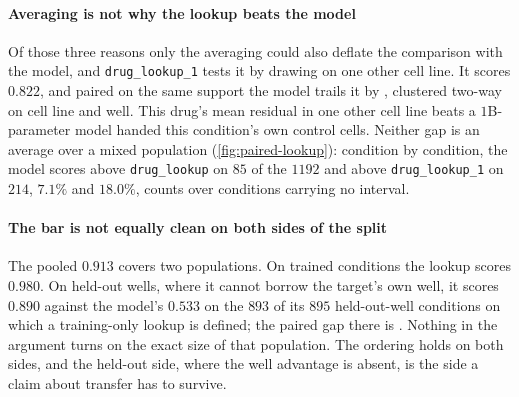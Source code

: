 \paragraph{Averaging is not why the lookup beats the model} Of those three
reasons only the averaging could also deflate the comparison with the model, and
\texttt{drug\_lookup\_1} tests it by drawing on one other cell line. It scores
$0.822$, and paired on the same support the model trails it by
, clustered two-way on cell line and well. This
drug's mean residual in one other cell line beats a $1$B-parameter model handed
this condition's own control cells. Neither gap is an average over a mixed
population (\cref{fig:paired-lookup}): condition by condition, the model scores
above \texttt{drug\_lookup} on $85$ of the $\num{1192}$ and above
\texttt{drug\_lookup\_1} on $214$, $7.1\%$ and $18.0\%$, counts over conditions
carrying no interval.

\paragraph{The bar is not equally clean on both sides of the split} The pooled
$0.913$ covers two populations. On trained conditions the lookup scores $0.980$.
On held-out wells, where it cannot borrow the target's own well, it scores
$0.890$ against the model's $0.533$ on the $893$ of its $895$ held-out-well
conditions on which a training-only lookup is defined; the paired gap there is . Nothing in the
argument turns on the exact size of that population. The ordering holds on both
sides, and the held-out side, where the well advantage is absent, is the side a
claim about transfer has to survive.

